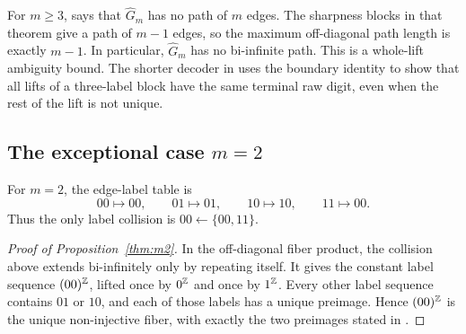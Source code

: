 For $m\ge3$,  says that $\widehat G_m$ has no path of $m$ edges. The sharpness blocks in that theorem give a path of $m-1$ edges, so the maximum off-diagonal path length is exactly $m-1$. In particular, $\widehat G_m$ has no bi-infinite path. This is a whole-lift ambiguity bound. The shorter decoder in  uses the boundary identity to show that all lifts of a three-label block have the same terminal raw digit, even when the rest of the lift is not unique.

\subsection{The exceptional case \texorpdfstring{$m=2$}{m = 2}}

For $m=2$, the edge-label table is
\[
00\mapsto 00,
\qquad
01\mapsto 01,
\qquad
10\mapsto 10,
\qquad
11\mapsto 00.
\]
Thus the only label collision is $00\leftarrow\{00,11\}$.

\begin{proof}[Proof of Proposition~\ref{thm:m2}]
In the off-diagonal fiber product, the collision above extends bi-infinitely only by repeating itself. It gives the constant label sequence $(00)^{\mathbb{Z}}$, lifted once by $0^{\mathbb{Z}}$ and once by $1^{\mathbb{Z}}$. Every other label sequence contains $01$ or $10$, and each of those labels has a unique preimage. Hence $(00)^{\mathbb{Z}}$ is the unique non-injective fiber, with exactly the two preimages stated in .
\end{proof}
